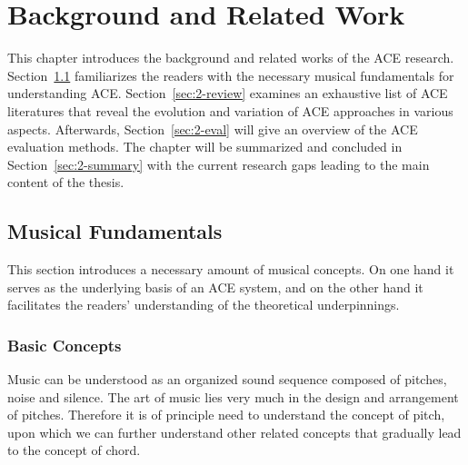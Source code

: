 


\chapter{Background and Related Work}\label{cp:background} %


This chapter introduces the background and related works of the ACE research. Section~\ref{sec:2-fund} familiarizes the readers with the necessary musical fundamentals for understanding ACE. Section~\ref{sec:2-review} examines an exhaustive list of ACE literatures that reveal the evolution and variation of ACE approaches in various aspects. Afterwards, Section~\ref{sec:2-eval} will give an overview of the ACE evaluation methods. The chapter will be summarized and concluded in Section~\ref{sec:2-summary} with the current research gaps leading to the main content of the thesis.



\section{Musical Fundamentals} \label{sec:2-fund}
This section introduces a necessary amount of musical concepts. On one hand it serves as the underlying basis of an ACE system, and on the other hand it facilitates the readers' understanding of the theoretical underpinnings.


\subsection{Basic Concepts}
Music can be understood as an organized sound sequence composed of pitches, noise and silence. The art of music lies very much in the design and arrangement of pitches. Therefore it is of principle need to understand the concept of pitch, upon which we can further understand other related concepts that gradually lead to the concept of chord.

